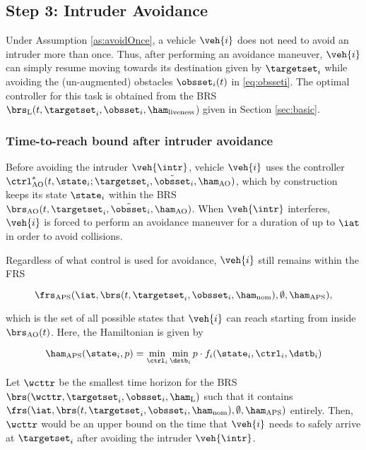 \subsection{Step 3: Intruder Avoidance \label{sec:intruder_after}}
Under Assumption \ref{as:avoidOnce}, a vehicle $\veh{i}$ does not need to avoid an intruder more than once. Thus, after performing an avoidance maneuver, $\veh{i}$ can simply resume moving towards its destination given by $\targetset_i$ while avoiding the (un-augmented) obstacles $\obsset_i(t)$ in \eqref{eq:obsseti}. The optimal controller for this task is obtained from the BRS $\brs_\text{L}(t, \targetset_i, \obsset_i, \ham_\text{liveness}$) given in Section \ref{sec:basic}.

\subsubsection{Time-to-reach bound after intruder avoidance}
Before avoiding the intruder $\veh{\intr}$, vehicle $\veh{i}$ uses the controller $\ctrl^*_\text{AO}(t, \state_i; \targetset_i, \tilde\obsset_i, \ham_\text{AO})$, which by construction keeps its state $\state_i$ within the BRS $\brs_\text{AO}(t, \targetset_i, \tilde\obsset_i, \ham_\text{AO})$. When $\veh{\intr}$ interferes, $\veh{i}$ is forced to perform an avoidance maneuver for a duration of up to $\iat$ in order to avoid collisions. 

Regardless of what control is used for avoidance, $\veh{i}$ still remains within the FRS 

\begin{equation}
\frs_\text{APS}(\iat, \brs(t, \targetset_i, \obsset_i, \ham_\text{nom}), \emptyset, \ham_\text{APS}), 
\end{equation}

\noindent which is the set of all possible states that $\veh{i}$ can reach starting from inside $\brs_\text{AO}(t)$. Here, the Hamiltonian is given by

\begin{equation}
\ham_\text{APS}(\state_i, p) = \min_{\ctrl_i} \min_{\dstb_i} p \cdot f_i (\state_i, \ctrl_i, \dstb_i)
\end{equation}

Let $\wcttr$ be the smallest time horizon for the BRS $\brs(\wcttr, \targetset_i, \obsset_i, \ham_\text{L})$ such that it contains $\frs(\iat, \brs(t, \targetset_i, \obsset_i, \ham_\text{nom}), \emptyset, \ham_\text{APS})$ entirely. Then, $\wcttr$ would be an upper bound on the time that $\veh{i}$ needs to safely arrive at $\targetset_i$ after avoiding the intruder $\veh{\intr}$.